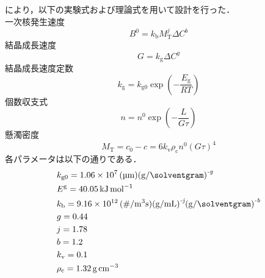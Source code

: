 \documentclass[a4j]{jsreport}
\begin{document}
\cite{晶析}により，以下の実験式および理論式を用いて設計を行った．\\
一次核発生速度
\begin{equation}
    B^0 = k_\mathrm{b} M_\mathrm{T}^j \varDelta C^b
\end{equation}
結晶成長速度
\begin{equation}
    G = k_\mathrm{g} \varDelta C^g
\end{equation}
結晶成長速度定数
\begin{equation}
    k_\mathrm{g} = k_\mathrm{g0} \exp \left( -\frac{E_\mathrm{g}}{RT} \right)
\end{equation}
個数収支式
\begin{equation}
    n=n^0 \exp \left( -\frac{L}{G\tau} \right)
\end{equation}
懸濁密度
\begin{equation}
    M_\mathrm{T} = c_0-c = 6k_\mathrm{v} \rho_\mathrm{c} n^0 (G\tau)^4
\end{equation}
各パラメータは以下の通りである．
\begin{align*}
    &k_\mathrm{g0} = 1.06\times10^7 \, \si{(\micro \meter)(\gram / \solventgram)^{\textit{-g}}} \\
    &E^{\mathrm{g}} = 40.05 \, \si{\kilo \joule \per \mole} \\
    &k_\mathrm{b} = 9.16 \times 10^{12} \, \si{(\# / \cubic \meter \second) (\gram / \milli \liter)^{\textit{-j}} (\gram / \solventgram)^{\textit{-b}}} \\
    &g = 0.44 \\
    &j = 1.78 \\
    &b = 1.2 \\
    &k_\mathrm{v} = 0.1 \\
    &\rho_\mathrm{c} = 1.32 \, \si{\gram \per \centi \metre \cubed}
\end{align*}
\end{document}
